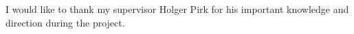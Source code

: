 \cleardoublepage


\begin{acknowledgements}

I would like to thank my supervisor Holger Pirk for his important knowledge and direction during the project.

\end{acknowledgements}
